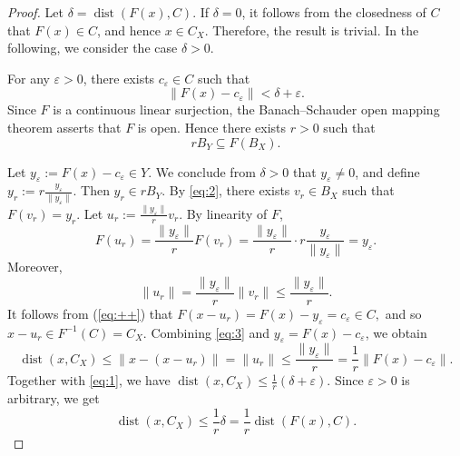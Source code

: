 \documentclass[11pt]{article}
\begin{document}
\begin{proof}
	Let $\delta = \operatorname{dist}(F(x), C)$. 
	If \(\delta=0\),  it follows from   the closedness of  \(C\)   that 
	 \(F(x)\in C\), and hence \(x\in C_X\). Therefore, the result is trivial. In the following, we consider the case \(\delta>0\).
	
	
	
	
	For any $\varepsilon > 0$,   there exists $c_\varepsilon \in C$ such that
	\begin{equation}\label{eq:1}
		\|F(x) - c_\varepsilon\| < \delta + \varepsilon .
	\end{equation}
	Since $F$ is a continuous linear surjection, the Banach--Schauder open mapping theorem asserts that $F$ is open. Hence there exists $r>0$ such that
	\begin{equation}\label{eq:2}
		r B_Y \subseteq F(B_X).
	\end{equation}
 
	
	Let $y_\varepsilon := F(x) - c_\varepsilon \in Y$.	We conclude from  \(\delta>0\)  that    $y_\varepsilon \neq 0$,  and define
$	y_r := r \frac{y_\varepsilon}{\|y_\varepsilon\|}.$
	Then $y_r \in r B_Y$. By \eqref{eq:2}, there exists $v_r \in B_X$ such that $F(v_r) = y_r$. Let
$	u_r := \frac{\|y_\varepsilon\|}{r} v_r.$
	By linearity of $F$,
	\begin{equation}\label{eq:++}
	F(u_r) = \frac{\|y_\varepsilon\|}{r} F(v_r) = \frac{\|y_\varepsilon\|}{r} \cdot r \frac{y_\varepsilon}{\|y_\varepsilon\|} = y_\varepsilon.
	\end{equation}
	Moreover,
	\begin{equation}\label{eq:3}
		\|u_r\| = \frac{\|y_\varepsilon\|}{r} \|v_r\| \leq \frac{\|y_\varepsilon\|}{r} .
	\end{equation}
It follows from  (\ref{eq:++})  that  $	F(x - u_r) = F(x) - y_\varepsilon = c_\varepsilon \in C,$
and	so $x - u_r \in F^{-1}(C) = C_X$. Combining \eqref{eq:3} and $y_\varepsilon = F(x) - c_\varepsilon$, we obtain
	\begin{equation}\label{eq:4}
		\operatorname{dist}(x, C_X) \le \|x - (x - u_r)\| = \|u_r\| \leq \frac{\|y_\varepsilon\|}{r} = \frac{1}{r} \|F(x) - c_\varepsilon\|.
	\end{equation}
	Together with \eqref{eq:1}, we have
$	\operatorname{dist}(x, C_X) \le \frac{1}{r} (\delta + \varepsilon).$
	Since $\varepsilon > 0$ is arbitrary,  we get
	\[
	\operatorname{dist}(x, C_X) \le \frac{1}{r} \delta = \frac{1}{r} \operatorname{dist}(F(x), C).
	\]
\end{proof}
\end{document}
